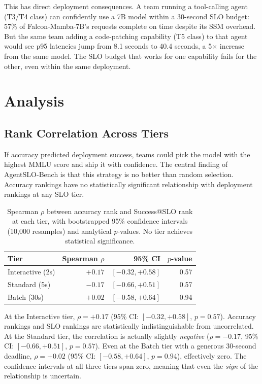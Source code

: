 \documentclass[11pt]{article}
\begin{document}
This has direct deployment consequences.  A team running a tool-calling agent (T3/T4 class) can confidently use a 7B model within a 30-second SLO budget: 57\% of Falcon-Mamba-7B's requests complete on time despite its SSM overhead.  But the same team adding a code-patching capability (T5 class) to that agent would see p95 latencies jump from 8.1 seconds to 40.4 seconds, a 5$\times$ increase from the same model.  The SLO budget that works for one capability fails for the other, even within the same deployment.

\section{Analysis}

\subsection{Rank Correlation Across Tiers}

If accuracy predicted deployment success, teams could pick the model with the highest MMLU score and ship it with confidence.  The central finding of AgentSLO-Bench is that this strategy is no better than random selection.  Accuracy rankings have no statistically significant relationship with deployment rankings at any SLO tier.

\begin{table}[h]
\centering
\caption{Spearman $\rho$ between accuracy rank and Success@SLO rank at each tier, with bootstrapped 95\% confidence intervals (10{,}000 resamples) and analytical $p$-values.  No tier achieves statistical significance.}
\label{tab:spearman}
\begin{tabular}{lrrr}
\toprule
\textbf{Tier} & \textbf{Spearman $\rho$} & \textbf{95\% CI} & \textbf{$p$-value} \\
\midrule
Interactive (2s)  & $+0.17$ & $[-0.32, +0.58]$ & 0.57 \\
Standard (5s)     & $-0.17$ & $[-0.66, +0.51]$ & 0.57 \\
Batch (30s)       & $+0.02$ & $[-0.58, +0.64]$ & 0.94 \\
\bottomrule
\end{tabular}
\end{table}

At the Interactive tier, $\rho = +0.17$ (95\% CI: $[-0.32, +0.58]$, $p = 0.57$).  Accuracy rankings and SLO rankings are statistically indistinguishable from uncorrelated.  At the Standard tier, the correlation is actually slightly \emph{negative} ($\rho = -0.17$, 95\% CI: $[-0.66, +0.51]$, $p = 0.57$).  Even at the Batch tier with a generous 30-second deadline, $\rho = +0.02$ (95\% CI: $[-0.58, +0.64]$, $p = 0.94$), effectively zero.  The confidence intervals at all three tiers span zero, meaning that even the \emph{sign} of the relationship is uncertain.
\end{document}
